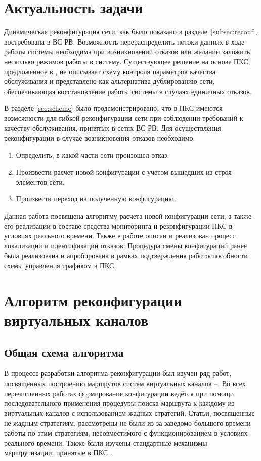 \documentclass[12pt, a4paper]{article}
\begin{document}
\section{Актуальность задачи}
Динамическая реконфигурация сети, как было показано в разделе~\ref{subsec:reconf}, востребована в ВС РВ. Возможность перераспределить потоки данных в ходе работы системы необходима при возникновении отказов или желании заложить несколько режимов работы в систему. Существующее решение на основе ПКС, предложенное в \cite{fakevlsdn}, не описывает схему контроля параметров качества обслуживания и представлено как альтернатива дублированию сети, обеспечивающая восстановление работы системы в случаях единичных отказов. 

В разделе \ref{sec:scheme} было продемонстрировано, что в ПКС имеются возможности для гибкой реконфигурации сети при соблюдении требований к качеству обслуживания, принятых в сетях ВС РВ. Для осуществления реконфигурации в случае возникновения отказов необходимо:
\begin{enumerate}
	\item Определить, в какой части сети произошел отказ.
	\item Произвести расчет новой конфигурации с учетом вышедших из строя элементов сети.
	\item Произвести переход на полученную конфигурацию.
\end{enumerate}

Данная работа посвящена алгоритму расчета новой конфигурации сети, а также его реализации в составе средства мониторинга и реконфигурации ПКС в условиях реального времени. Также в работе описан и реализован процесс локализации и идентификации отказов. Процедура смены конфигураций ранее была реализована и апробирована в рамках подтверждения работоспособности схемы управления трафиком в ПКС.

\section{Алгоритм реконфигурации виртуальных каналов} \label{sec:alg}
\subsection{Общая схема алгоритма}

В процессе разработки алгоритма реконфигурации был изучен ряд работ, посвященных построению маршрутов систем виртуальных каналов \cite{alg1}--\cite{vdovinalg}. Во всех перечисленных работах формирование конфигурации ведётся при помощи последовательного применения процедуры поиска маршрута к каждому из виртуальных каналов с использованием жадных стратегий. Статьи, посвященные не жадным стратегиям, рассмотрены не были из-за заведомо большого времени работы по этим стратегиям, несовместимого с функционированием в условиях реального времени. Также были изучены стандартные механизмы маршрутизации, принятые в ПКС \cite{algsdn}.
\end{document}

